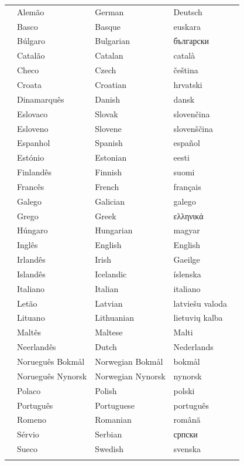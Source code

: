 \documentclass[]{../metanetpaper}
\begin{document}
\vspace*{-5mm}
\centering
  \setlength{\tabcolsep}{2em}
  \begin{tabularx}{\textwidth}{lllll} \toprule\addlinespace
  &Alemão & German & Deutsch& \\
  &Basco & Basque & euskara& \\
  &Búlgaro & Bulgarian & български& \\
  &Catalão & Catalan & català& \\
  &Checo & Czech & čeština& \\
  &Croata & Croatian & hrvatski& \\
  &Dinamarquês & Danish & dansk& \\
  &Eslovaco & Slovak & slovenčina& \\
  &Esloveno & Slovene & slovenščina& \\
  &Espanhol & Spanish & español& \\
  &Estónio & Estonian & eesti& \\
  &Finlandês & Finnish & suomi& \\
  &Francês & French & français& \\
  &Galego & Galician & galego& \\
  &Grego & Greek & ελληνικά& \\
  &Húngaro & Hungarian & magyar& \\
  &Inglês & English & English& \\
  &Irlandês & Irish & Gaeilge& \\
  &Islandês & Icelandic & íslenska& \\
  &Italiano & Italian & italiano& \\
  &Letão & Latvian & latviešu valoda& \\
  &Lituano & Lithuanian & lietuvių kalba& \\
  &Maltês & Maltese & Malti& \\
  &Neerlandês & Dutch & Nederlands& \\
  &Norueguês Bokmål & Norwegian Bokmål & bokmål& \\
  &Norueguês Nynorsk & Norwegian Nynorsk & nynorsk& \\
  &Polaco & Polish & polski& \\
  &Português & Portuguese & português& \\
  &Romeno & Romanian & română& \\
  &Sérvio & Serbian & српски& \\
  &Sueco & Swedish & svenska& \\ \addlinespace \bottomrule
\end{tabularx}
\end{document}
